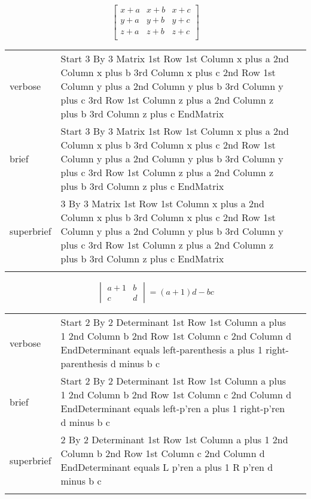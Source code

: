 
\label{sec:la}

\R
\E \[
\begin{bmatrix}
  x+a & x+b & x+c\\
  y+a & y+b & y+c\\
  z+a & z+b & z+c\\
\end{bmatrix}
\]

\begin{longtable}[c]{@{}lll@{}}
\toprule\addlinespace
verbose & Start 3 By 3 Matrix 1st Row 1st Column x plus a 2nd Column x
plus b 3rd Column x plus c 2nd Row 1st Column y plus a 2nd Column y plus
b 3rd Column y plus c 3rd Row 1st Column z plus a 2nd Column z plus b
3rd Column z plus c EndMatrix &

\\\addlinespace
brief & Start 3 By 3 Matrix 1st Row 1st Column x plus a 2nd Column x
plus b 3rd Column x plus c 2nd Row 1st Column y plus a 2nd Column y plus
b 3rd Column y plus c 3rd Row 1st Column z plus a 2nd Column z plus b
3rd Column z plus c EndMatrix &

\\\addlinespace
superbrief & 3 By 3 Matrix 1st Row 1st Column x plus a 2nd Column x plus
b 3rd Column x plus c 2nd Row 1st Column y plus a 2nd Column y plus b
3rd Column y plus c 3rd Row 1st Column z plus a 2nd Column z plus b 3rd
Column z plus c EndMatrix &

\\\addlinespace
\bottomrule
\end{longtable}

\R
\E \[
\begin{vmatrix}
  a+1 & b\\
  c & d
\end{vmatrix}
= (a+1)d-b c
\]

\begin{longtable}[c]{@{}lll@{}}
\toprule\addlinespace
verbose & Start 2 By 2 Determinant 1st Row 1st Column a plus 1 2nd
Column b 2nd Row 1st Column c 2nd Column d EndDeterminant equals
left-parenthesis a plus 1 right-parenthesis d minus b c &

\\\addlinespace
brief & Start 2 By 2 Determinant 1st Row 1st Column a plus 1 2nd Column
b 2nd Row 1st Column c 2nd Column d EndDeterminant equals left-p'ren a
plus 1 right-p'ren d minus b c &

\\\addlinespace
superbrief & 2 By 2 Determinant 1st Row 1st Column a plus 1 2nd Column b
2nd Row 1st Column c 2nd Column d EndDeterminant equals L p'ren a plus 1
R p'ren d minus b c &

\\\addlinespace
\bottomrule
\end{longtable}

